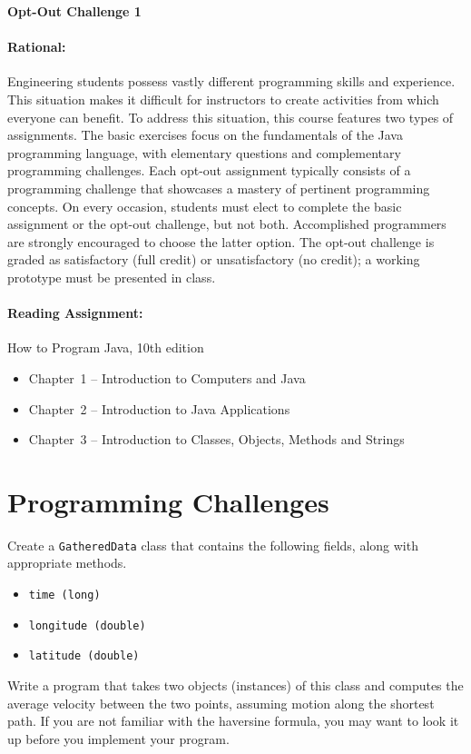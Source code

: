 \documentclass[11pt]{article}
\begin{document}
\begin{center}
{\bfseries \LARGE Opt-Out Challenge 1}
\end{center}

\paragraph{Rational:}
Engineering students possess vastly different programming skills and experience.
This situation makes it difficult for instructors to create activities from which everyone can benefit.
To address this situation, this course features two types of assignments.
The basic exercises focus on the fundamentals of the Java programming language, with elementary questions and complementary programming challenges.
Each opt-out assignment typically consists of a programming challenge that showcases a mastery of pertinent programming concepts.
On every occasion, students must elect to complete the basic assignment or the opt-out challenge, but not both.
Accomplished programmers are strongly encouraged to choose the latter option.
The opt-out challenge is graded as satisfactory (full credit) or unsatisfactory (no credit); a working prototype must be presented in class.


\paragraph{Reading Assignment:}
How to Program Java, 10th edition
\begin{itemize}
\item Chapter~1 -- Introduction to Computers and Java
\item Chapter~2 -- Introduction to Java Applications
\item Chapter~3 -- Introduction to Classes, Objects, Methods and Strings
\end{itemize}


\section*{Programming Challenges}

Create a \texttt{GatheredData} class that contains the following fields, along with appropriate methods.
\begin{itemize}
\item \texttt{time (long)}
\item \texttt{longitude (double)}
\item \texttt{latitude (double)}
\end{itemize}
Write a program that takes two objects (instances) of this class and computes the average velocity between the two points, assuming motion along the shortest path.
If you are not familiar with the haversine formula, you may want to look it up before you implement your program.
\end{document}
